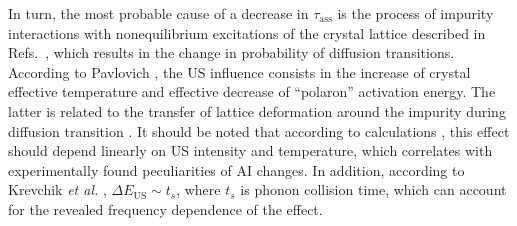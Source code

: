 \documentclass[%
 aip,jap,
 amsmath,amssymb,
 reprint,%
]{revtex4-1}
\begin{document}
In turn, the most probable cause of a decrease in $\tau_\mathrm{ass}$ is the process of impurity interactions with nonequilibrium excitations of the crystal lattice described in
Refs.~,
which results in the change in probability of diffusion transitions.
According to Pavlovich \cite{Pavlovich}, the US influence consists in the increase of crystal effective temperature and effective decrease of ``polaron'' activation energy.
The latter is related to the transfer of lattice deformation around the impurity during diffusion transition \cite{Pavlovich}.
It should be noted that according to calculations \cite{Pavlovich}, this effect should depend linearly on US intensity and temperature,
which correlates with experimentally found peculiarities of AI changes.
In addition, according to Krevchik \emph{et al.} \cite{Krevchik},
$\Delta E_\mathrm{US}\sim t_s$,
where $t_s$ is phonon collision time, which can account for the revealed frequency dependence of the effect.
\end{document}
